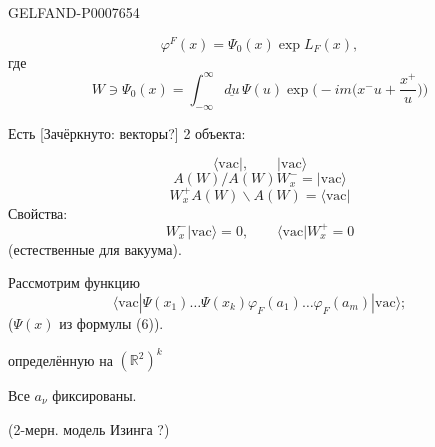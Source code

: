 \begin{GelfandAdjacentEvidence}{GELFAND-P000765}{4}

\begin{equation*}
\tag{15}
\varphi^F(x)=\Psi_0(x)\exp L_F(x),
\end{equation*}
где
\begin{equation*}
\tag{16}
W\ni\Psi_0(x)=\int_{-\infty}^{\infty}\underline{du}\,\Psi(u)
\exp\biggl(-im\biggl(x^-u+\frac{x^+}{u}\biggr)\biggr)
\end{equation*}

Есть [Зачёркнуто: векторы?] 2 объекта:
\end{GelfandAdjacentEvidence}

\[
\langle \mathrm{vac}|,\qquad |\mathrm{vac}\rangle
\]
\begin{equation*}
\tag*{\((17)_1\)}
A(W)/A(W)W_x^-=|\mathrm{vac}\rangle
\end{equation*}
\begin{equation*}
\tag*{\((17)_2\)}
W_x^+A(W)\backslash A(W)=\langle\mathrm{vac}|
\end{equation*}
Свойства:
\begin{equation*}
\tag{18}
W_x^-|\mathrm{vac}\rangle=0,\qquad\langle\mathrm{vac}|W_x^+=0
\end{equation*}
(естественные для вакуума).

Рассмотрим функцию
\begin{equation*}
\tag{19}
\langle\mathrm{vac}|\Psi(x_1)\ldots
\Psi(x_k)\varphi_F(a_1)\ldots\varphi_F(a_m)|\mathrm{vac}\rangle;
\end{equation*}
(\(\Psi(x)\) из формулы (6)).

определённую на \((\mathbb R^2)^k\)

Все \(a_\nu\) фиксированы.

(2-мерн. модель Изинга ?)


